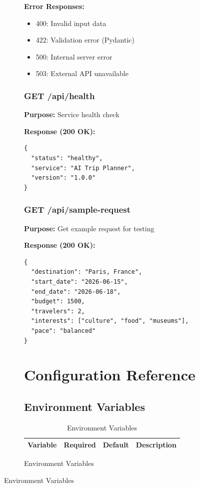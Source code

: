 \documentclass[12pt,a4paper]{report}
\begin{document}
\begin{figure}[H]
\begin{plantuml}
\begin{figure}[H]
\begin{plantuml}
\textbf{Error Responses:}
\begin{itemize}
    \item 400: Invalid input data
    \item 422: Validation error (Pydantic)
    \item 500: Internal server error
    \item 503: External API unavailable
\end{itemize}

\subsection{GET /api/health}

\textbf{Purpose:} Service health check

\textbf{Response (200 OK):}
\begin{lstlisting}[style=jsonStyle]
{
  "status": "healthy",
  "service": "AI Trip Planner",
  "version": "1.0.0"
}
\end{lstlisting}

\subsection{GET /api/sample-request}

\textbf{Purpose:} Get example request for testing

\textbf{Response (200 OK):}
\begin{lstlisting}[style=jsonStyle]
{
  "destination": "Paris, France",
  "start_date": "2026-06-15",
  "end_date": "2026-06-18",
  "budget": 1500,
  "travelers": 2,
  "interests": ["culture", "food", "museums"],
  "pace": "balanced"
}
\end{lstlisting}


\chapter{Configuration Reference}

\section{Environment Variables}

\begin{longtable}{|l|l|l|p{5cm}|}
\caption{Environment Variables} \\
\hline
\textbf{Variable} & \textbf{Required} & \textbf{Default} & \textbf{Description} \\
\hline
\endfirsthead


\end{longtable}
\end{plantuml}
\end{figure}
\end{plantuml}
\end{figure}
\end{document}
